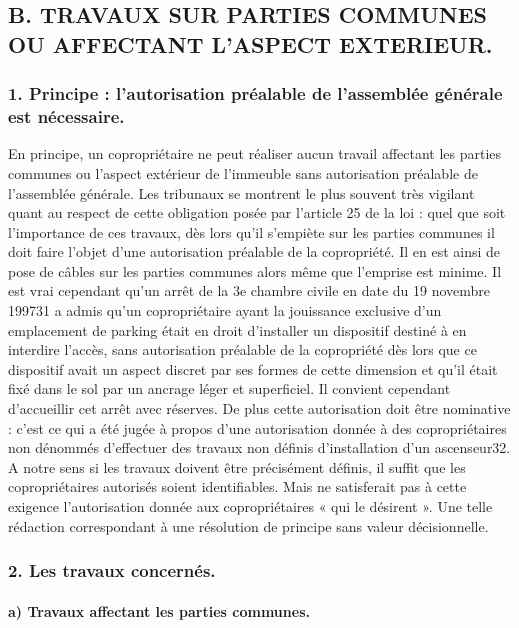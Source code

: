 	\subsection{B. TRAVAUX SUR PARTIES COMMUNES OU AFFECTANT L’ASPECT EXTERIEUR.}
	
		\subsubsection{1. Principe : l’autorisation préalable de l’assemblée générale est nécessaire.}
		
			En principe, un copropriétaire ne peut réaliser aucun travail affectant les parties communes ou l'aspect extérieur de l'immeuble sans autorisation préalable de l'assemblée générale.
			Les tribunaux se montrent le plus souvent très vigilant quant au respect de cette obligation posée par l'article 25 de la loi : quel que soit l'importance de ces travaux, dès lors qu'il s'empiète sur les parties communes il doit faire l'objet d'une autorisation préalable de la copropriété.
			Il en est ainsi de pose de câbles sur les parties communes alors même que l'emprise est minime.
			Il est vrai cependant qu'un arrêt de la 3e chambre civile en date du 19 novembre 199731 a admis qu'un copropriétaire ayant la jouissance exclusive d'un emplacement de parking était en droit d'installer un dispositif destiné à en interdire l'accès, sans autorisation préalable de la copropriété dès lors que ce dispositif avait un aspect discret par ses formes de cette dimension et qu'il était fixé dans le sol par un ancrage léger et superficiel. Il convient cependant d'accueillir cet arrêt avec réserves.
			De plus cette autorisation doit être nominative : c’est ce qui a été jugée à propos d’une autorisation donnée à des copropriétaires non dénommés d’effectuer des travaux non définis d’installation d’un ascenseur32. A notre sens si les travaux doivent être précisément définis, il suffit que les copropriétaires autorisés soient identifiables. Mais ne satisferait pas à cette exigence l’autorisation donnée aux copropriétaires « qui le désirent ». Une telle rédaction correspondant à une résolution de principe sans valeur décisionnelle.
		
		\subsubsection{2. Les travaux concernés.}
		
			\paragraph{a) Travaux affectant les parties communes.}
			
